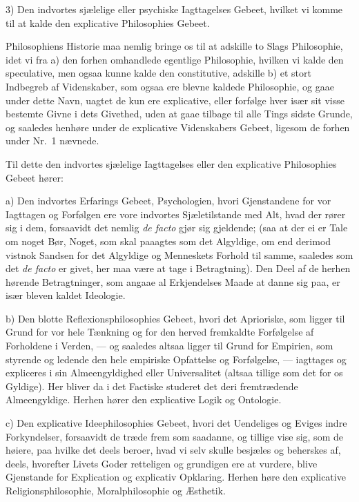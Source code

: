 \documentclass[12pt,a4paper]{book}
\newcommand{\apage}[1]{\marginnote{\footnotesize\textit{[#1]}}}
\begin{document}
3) Den indvortes sjælelige eller psychiske Iagttagelses Gebeet, hvilket vi komme
til at kalde den explicative Philosophies Gebeet.

Philosophiens Historie maa nemlig bringe os til at adskille to Slags Philosophie,
idet vi fra a) den forhen omhandlede egentlige Philosophie, hvilken vi kalde den
speculative, men ogsaa kunne kalde den constitutive, adskille b) et stort Indbegreb
af Videnskaber, som ogsaa ere blevne kaldede Philosophie, og gaae under dette Navn,
uagtet de kun ere explicative, eller forfølge hver især sit visse bestemte Givne i
dets Givethed, uden at gaae tilbage til alle Tings sidste Grunde, og saaledes
henhøre under de explicative Videnskabers Gebeet, ligesom de forhen under Nr.\ 1
nævnede.

Til dette den indvortes sjælelige Iagttagelses eller den explicative Philosophies
Gebeet hører:

a) Den indvortes Erfarings Gebeet, Psychologien, hvori Gjenstandene for vor
Iagttagen og Forfølgen ere vore indvortes Sjæletilstande med Alt, hvad der rører
sig i dem, forsaavidt det nemlig \textit{de facto} gjør sig gjeldende; (saa at der
ei er Tale om noget Bør, Noget, som skal paaagtes som det Algyldige, om end derimod
vistnok Sandsen for det Algyldige og Menneskets Forhold til samme, saaledes som det
\textit{de facto} er givet, her maa være at tage i Betragtning). Den Deel af de
herhen hørende Betragtninger, som angaae al Erkjendelses Maade at danne sig paa, er
især bleven kaldet Ideologie.

b) Den blotte Reflexionsphilosophies Gebeet, hvori det Aprioriske, som ligger til
Grund for vor hele Tænkning og for den herved fremkaldte Forfølgelse af Forholdene
i Verden, --- og saaledes altsaa ligger til Grund for Empirien, som styrende og
ledende den hele empiriske Opfattelse og Forfølgelse, --- iagttages og expliceres i
sin Almeengyldighed eller Universalitet (altsaa tillige som  \apage{36} det for os Gyldige). Her
bliver da i det Factiske studeret det deri fremtrædende Almeengyldige. Herhen hører
den explicative Logik og Ontologie.

c) Den explicative Ideephilosophies Gebeet, hvori det Uendeliges og Eviges indre
Forkyndelser, forsaavidt de træde frem som saadanne, og tillige vise sig, som de
høiere, paa hvilke det deels beroer, hvad vi selv skulle besjæles og beherskes af,
deels, hvorefter Livets Goder retteligen og grundigen ere at vurdere, blive
Gjenstande for Explication og explicativ Opklaring. Herhen høre den explicative
Religionsphilosophie, Moralphilosophie og Æsthetik.
\end{document}

